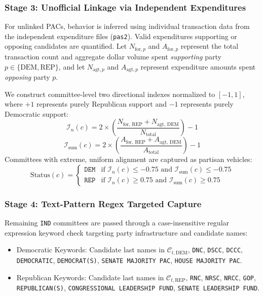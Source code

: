 \subsubsection{Stage 3: Unofficial Linkage via Independent Expenditures}
For unlinked PACs, behavior is inferred using individual transaction data from the independent expenditure files (\texttt{pas2}). Valid expenditures supporting or opposing candidates are quantified. Let $N_{\text{for}, p}$ and $A_{\text{for}, p}$ represent the total transaction count and aggregate dollar volume spent \textit{supporting} party $p \in \{\text{DEM}, \text{REP}\}$, and let $N_{\text{agt}, p}$ and $A_{\text{agt}, p}$ represent expenditure amounts spent \textit{opposing} party $p$. 

We construct committee-level two directional indexes normalized to $[-1, 1]$, where $+1$ represents purely Republican support and $-1$ represents purely Democratic support:
\begin{equation}
    \mathcal{I}_{n}(c) = 2 \times \left( \frac{N_{\text{for, REP}} + N_{\text{agt, DEM}}}{N_{\text{total}}} \right) - 1
\end{equation}
\begin{equation}
    \mathcal{I}_{\text{sum}}(c) = 2 \times \left( \frac{A_{\text{for, REP}} + A_{\text{agt, DEM}}}{A_{\text{total}}} \right) - 1
\end{equation}
Committees with extreme, uniform alignment are captured as partisan vehicles:
\begin{equation}
    \text{Status}(c) = \begin{cases} 
        \texttt{DEM} & \text{if } \mathcal{I}_{n}(c) \le -0.75 \text{ and } \mathcal{I}_{\text{sum}}(c) \le -0.75 \\
        \texttt{REP} & \text{if } \mathcal{I}_{n}(c) \ge 0.75 \text{ and } \mathcal{I}_{\text{sum}}(c) \ge 0.75 
    \end{cases}
\end{equation}

\subsubsection{Stage 4: Text-Pattern Regex Targeted Capture}
Remaining \texttt{IND} committees are passed through a case-insensitive regular expression keyword check targeting party infrastructure and candidate names:
\begin{itemize}
    \item {Democratic Keywords}: Candidate last names in $\mathcal{C}_{t,\text{DEM}}$, \texttt{DNC}, \texttt{DSCC}, \texttt{DCCC}, \texttt{DEMOCRATIC}, \texttt{DEMOCRAT(S)}, \texttt{SENATE MAJORITY PAC}, \texttt{HOUSE MAJORITY PAC}.
    \item {Republican Keywords}: Candidate last names in $\mathcal{C}_{t,\text{REP}}$, \texttt{RNC}, \texttt{NRSC}, \texttt{NRCC}, \texttt{GOP}, \texttt{REPUBLICAN(S)}, \texttt{CONGRESSIONAL LEADERSHIP FUND}, \texttt{SENATE LEADERSHIP FUND}.
\end{itemize}

